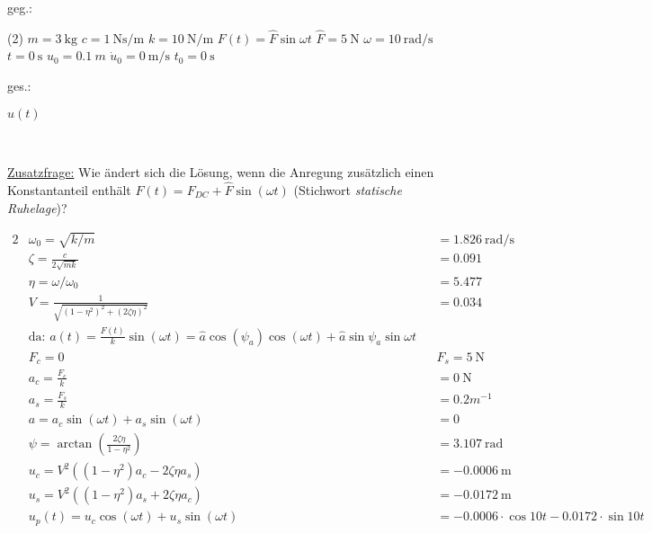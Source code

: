     \begin{minipage}[t]{.49\linewidth}
        geg.:
        \begin{tasks} (2)
           \task[] $m = \SI{3}{\kilo\gram}$
           \task[] $c = \SI{1}{\newton\second\per\meter}$
           \task[] $k = \SI{10}{\newton\per\meter}$
            \task[] $F(t) = \hat{F} \sin{\omega t}$
           \task[] $\hat{F} = \SI{5}{\newton}$
           \task[] $\omega = \SI{10}{\radian\per\second}$
           \task[] $t=\SI{0}{\second}$
           \task[] $u_0 = \SI{0.1}{m}$
           \task[] $\dot{u}_0 = \SI{0}{\meter\per\second}$
           \task[] $t_0 = \SI{0}{\second}$
        \end{tasks}
        \end{minipage}
        \begin{minipage}[t]{.49\linewidth}
        ges.:
        \begin{tasks}
            \task[] $u(t)$
        \end{tasks}
    \end{minipage}\\
    \vspace{1cm}

    \underline{Zusatzfrage:} Wie ändert sich die Lösung, wenn die Anregung zusätzlich einen Konstantanteil enthält $F(t) = F_{DC} +\hat{F} \sin{(\omega t)}$ (Stichwort \textit{statische Ruhelage})?

    \begin{solution}
        \begin{alignat*}{2}
            &\omega_0 = \sqrt{k/m} &&= \SI{1.826}{\radian\per\second} \\
            &\zeta = \frac{c}{2\sqrt{mk}} &&= 0.091 \\
            &\eta = \omega/\omega_0 &&= 5.477\\
            &V = \frac{1}{\sqrt{(1 - \eta^2)^2 + (2\zeta\eta)^2}} &&= 0.034\\
            &\text{da: } a(t) = \frac{F(t)}{k} \sin(\omega t) = \hat{a} \cos(\psi_a) \cos(\omega t) + \hat{a} \sin{\psi_a} \sin{\omega t} \\
            &F_c = 0 && F_s = \SI{5}{\newton} \\
            &a_c = \frac{F_c}{k} &&= \SI{0}{\newton}\\ 
            &a_s = \frac{F_s}{k} &&= 0.2 m^{-1} \\
            &a= a_c \sin(\omega t) + a_s \sin(\omega t) &&= 0 \\
            &\psi = \arctan(\frac{2\zeta \eta}{1-\eta^2}) &&= \SI{3.107}{\radian}\\
            &u_c = V^2((1-\eta^2)a_c - 2 \zeta \eta a_s) &&= \SI{-0.0006}{\meter}\\
            &u_s = V^2((1 - \eta^2)a_s + 2 \zeta \eta a_c) &&= \SI{-0.0172}{\meter}\\
            &u_p(t)= u_c \cos(\omega t) + u_s \sin(\omega t) &&= -0.0006 \cdot \cos{10t} - 0.0172 \cdot \sin{10t}\\
        \end{alignat*}
    \end{solution}
        
